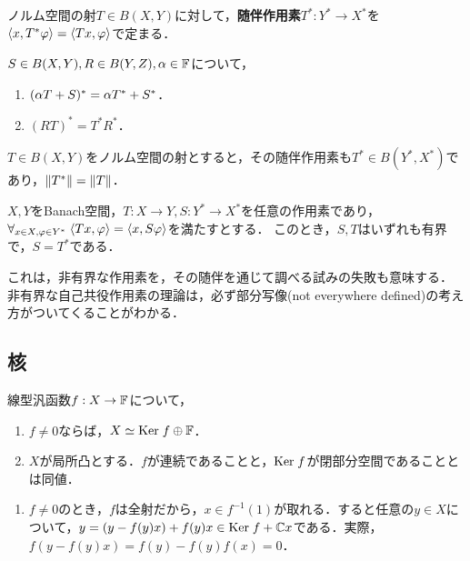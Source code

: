 \documentclass[uplatex,dvipdfmx]{jsreport}
\begin{document}
\begin{definition}
    ノルム空間の射$T\in B(X,Y)$に対して，\textbf{随伴作用素}$T^*:Y^*\to X^*$を$\langle x,T^*\varphi\rangle=\langle Tx,\varphi\rangle$で定まる．
\end{definition}

\begin{lemma}[$*$-作用素の関手性]
    $S\in B(X,Y),R\in B(Y,Z),\alpha\in\mathbb{F}$について，
    \begin{enumerate}
        \item $(\alpha T+S)^*=\alpha T^*+S^*$．
        \item $(RT)^*=T^*R^*$．
    \end{enumerate}
\end{lemma}

\begin{proposition}[$*$-作用素の等長性]
    $T\in B(X,Y)$をノルム空間の射とすると，その随伴作用素も$T^*\in B(Y^*,X^*)$であり，$\|T^*\|=\|T\|$．
\end{proposition}

\begin{proposition}[随伴であるための十分条件]
    $X,Y$をBanach空間，$T:X\to Y,S:Y^*\to X^*$を任意の作用素であり，\\
    $\forall_{x\in X,\varphi\in Y^*}\;\langle Tx,\varphi\rangle=\langle x,S\varphi\rangle$を満たすとする．
    このとき，$S,T$はいずれも有界で，$S=T^*$である．
\end{proposition}
\begin{remarks}
    これは，非有界な作用素を，その随伴を通じて調べる試みの失敗も意味する．
    非有界な自己共役作用素の理論は，必ず部分写像(not everywhere defined)の考え方がついてくることがわかる．
\end{remarks}

\subsection{核}

\begin{proposition}
    線型汎函数$f:X\to\mathbb{F}$について，
    \begin{enumerate}
        \item $f\ne 0$ならば，$X\simeq\mathrm{Ker}\; f\oplus\mathbb{F}$．
        \item $X$が局所凸とする．$f$が連続であることと，$\mathrm{Ker}\; f$が閉部分空間であることとは同値．
    \end{enumerate}
\end{proposition}
\begin{Proof}\mbox{}
    \begin{enumerate}
        \item $f\ne 0$のとき，$f$は全射だから，$x\in f^{-1}(1)$が取れる．すると任意の$y\in X$について，$y=(y-f(y)x)+f(y)x\in\mathrm{Ker}\; f+\mathbb{C} x$である．実際，$f(y-f(y)x)=f(y)-f(y)f(x)=0$．
    \end{enumerate}
\end{Proof}
\end{document}

